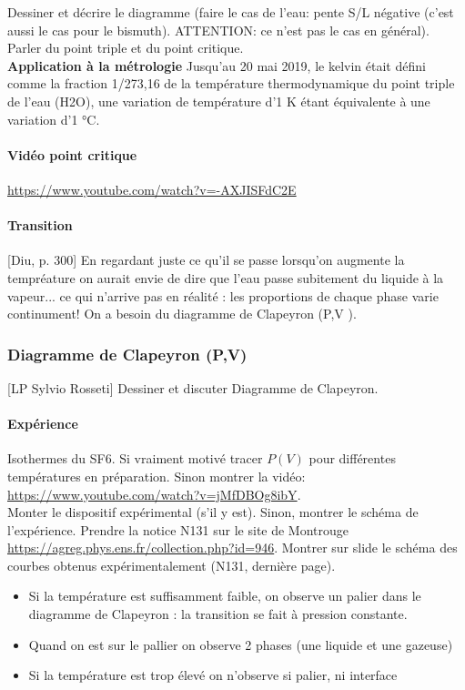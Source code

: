 \documentclass[11pt]{report}
\numberwithin{figure}{section}
\numberwithin{equation}{section}
\numberwithin{table}{section}
\newcommand{\1}{\boldsymbol{1}}
\begin{document}
Dessiner et décrire le diagramme (faire le cas de l'eau: pente S/L négative (c'est aussi le cas pour le bismuth). ATTENTION: ce n'est pas le cas en général). Parler du point triple et du point critique. \\

\textbf{Application à la métrologie} Jusqu’au 20 mai 2019, le kelvin était défini comme la fraction 1/273,16 de la température thermodynamique du point triple de l'eau (H2O), une variation de température d'1 K étant équivalente à une variation d'1 °C.

\paragraph{Vidéo point critique} \url{https://www.youtube.com/watch?v=-AXJISFdC2E}

\paragraph{Transition} [Diu, p. 300] En regardant juste ce qu’il se passe lorsqu’on augmente la tempréature on aurait envie de dire que
l’eau passe subitement du liquide à la vapeur... ce qui n’arrive pas en réalité : les proportions de chaque phase varie
continument! On a besoin du diagramme de Clapeyron (P,V ).


\subsubsection{Diagramme de Clapeyron (P,V)}

[LP Sylvio Rosseti] Dessiner et discuter Diagramme de Clapeyron.

\paragraph{Expérience} Isothermes du SF6. Si vraiment motivé tracer $P(V)$ pour différentes températures en préparation. Sinon montrer la vidéo: \url{https://www.youtube.com/watch?v=jMfDBOg8ibY}. \\

Monter le dispositif expérimental (s'il y est). Sinon, montrer le schéma de l'expérience. Prendre la notice N131 sur le site de Montrouge \url{https://agreg.phys.ens.fr/collection.php?id=946}. Montrer sur slide le schéma des courbes obtenus expérimentalement (N131, dernière page).


\begin{itemize}
\item Si la température est suffisamment faible, on observe un palier dans le diagramme de Clapeyron : la transition
se fait à pression constante.
\item Quand on est sur le pallier on observe 2 phases (une liquide et une gazeuse)
\item Si la température est trop élevé on n’observe si palier, ni interface
\end{itemize}
\end{document}
